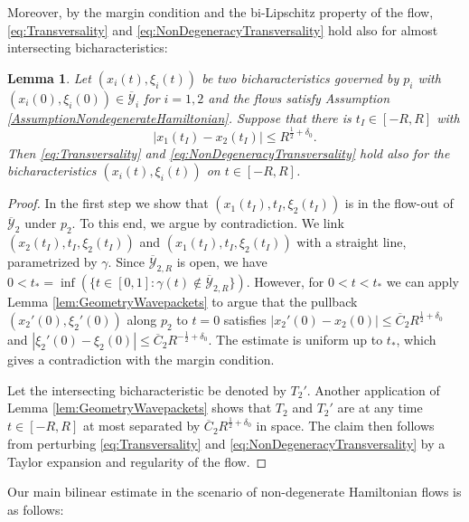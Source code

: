 \documentclass{amsart}
\newtheorem{lemma}[theorem]{Lemma}
\theoremstyle{definition}
\begin{document}
Moreover, by the margin condition and the bi-Lipschitz property of the flow, \eqref{eq:Transversality} and \eqref{eq:NonDegeneracyTransversality} hold also for almost intersecting bicharacteristics: 
\begin{lemma}
\label{lem:RegularityAlmostIntersectingI}
Let $(x_i(t),\xi_i(t))$ be two bicharacteristics governed by $p_i$ with \\ $(x_i(0),\xi_i(0)) \in \overline{\mathcal{Y}}_i$ for $i=1,2$ and the flows satisfy Assumption \ref{AssumptionNondegenerateHamiltonian}.
Suppose that there is $t_I \in [-R,R]$ with
    \begin{equation*}
        |x_1(t_I) - x_2(t_I)| \leq R^{\frac{1}{2}+\delta_0}.
    \end{equation*}
    Then \eqref{eq:Transversality} and \eqref{eq:NonDegeneracyTransversality} hold also for the bicharacteristics $(x_i(t),\xi_i(t))$ on $t \in [-R,R]$. 
\end{lemma}
\begin{proof}
    In the first step we show that $(x_1(t_I),t_I,\xi_2(t_I))$ is in the flow-out of $\overline{\mathcal{Y}}_2$ under $p_2$.
    To this end, we argue by contradiction. We link $(x_2(t_I),t_I,\xi_2(t_I))$ and $(x_1(t_I),t_I,\xi_2(t_I))$ with a straight line, parametrized by $\gamma$. Since $\overline{\mathcal{Y}}_{2,R}$ is open, we have
    $0<t_* = \inf ( \{ t \in [0,1] : \gamma(t) \not\in \overline{\mathcal{Y}}_{2,R} \})$. However, for $0<t<t_*$ we can apply Lemma \ref{lem:GeometryWavepackets} to argue that the pullback $(x_2'(0),\xi_2'(0))$ along $p_2$ to $t=0$ satisfies $|x_2'(0) - x_2(0)| \leq \overline{C}_2 R^{\frac{1}{2}+\delta_0}$ and $|\xi_2'(0)-\xi_2(0)| \leq \overline{C}_2 R^{-\frac{1}{2}+\delta_0}$. The estimate is uniform up to $t_*$, which gives a contradiction with the margin condition.

    Let the intersecting bicharacteristic be denoted by $T_2'$. Another application of Lemma \ref{lem:GeometryWavepackets} shows that $T_2$ and $T_2'$ are at any time $t \in [-R,R]$ at most separated by $\overline{C}_2 R^{\frac{1}{2}+\delta_0}$ in space. The claim then follows from perturbing \eqref{eq:Transversality} and \eqref{eq:NonDegeneracyTransversality} by a Taylor expansion and regularity of the flow.
\end{proof}

Our main bilinear estimate in the scenario of non-degenerate Hamiltonian flows
is as follows:
\end{document}
